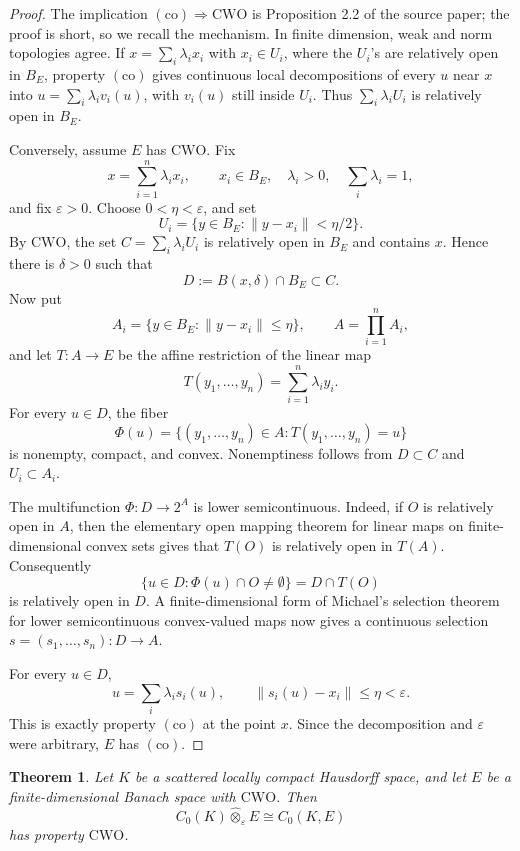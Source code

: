 \documentclass[11pt]{article}
\newtheorem{theorem}{Theorem}
\newcommand{\CWO}{\mathrm{CWO}}
\newcommand{\co}{\mathrm{(co)}}
\newcommand{\eps}{\varepsilon}
\begin{document}
\begin{proof}
The implication \(\co\Rightarrow \CWO\) is Proposition 2.2 of the source
paper; the proof is short, so we recall the mechanism. In finite dimension,
weak and norm topologies agree. If \(x=\sum_i\lambda_i x_i\) with
\(x_i\in U_i\), where the \(U_i\)'s are relatively open in \(B_E\), property
\(\co\) gives continuous local decompositions of every \(u\) near \(x\) into
\(u=\sum_i\lambda_i v_i(u)\), with \(v_i(u)\) still inside \(U_i\). Thus
\(\sum_i\lambda_i U_i\) is relatively open in \(B_E\).

Conversely, assume \(E\) has \(\CWO\). Fix
\[
  x=\sum_{i=1}^n \lambda_i x_i,\qquad
  x_i\in B_E,\quad \lambda_i>0,\quad \sum_i\lambda_i=1,
\]
and fix \(\varepsilon>0\). Choose \(0<\eta<\varepsilon\), and set
\[
  U_i=\{y\in B_E:\|y-x_i\|<\eta/2\}.
\]
By \(\CWO\), the set \(C=\sum_i\lambda_i U_i\) is relatively open in \(B_E\)
and contains \(x\). Hence there is \(\delta>0\) such that
\[
  D:=B(x,\delta)\cap B_E\subset C.
\]
Now put
\[
  A_i=\{y\in B_E:\|y-x_i\|\leq \eta\},\qquad
  A=\prod_{i=1}^n A_i,
\]
and let \(T:A\to E\) be the affine restriction of the linear map
\[
  T(y_1,\ldots,y_n)=\sum_{i=1}^n\lambda_i y_i.
\]
For every \(u\in D\), the fiber
\[
  \Phi(u)=\{(y_1,\ldots,y_n)\in A:T(y_1,\ldots,y_n)=u\}
\]
is nonempty, compact, and convex. Nonemptiness follows from \(D\subset C\)
and \(U_i\subset A_i\).

The multifunction \(\Phi:D\to 2^A\) is lower semicontinuous. Indeed, if
\(O\) is relatively open in \(A\), then the elementary open mapping theorem
for linear maps on finite-dimensional convex sets gives that \(T(O)\) is
relatively open in \(T(A)\). Consequently
\[
  \{u\in D:\Phi(u)\cap O\neq\emptyset\}=D\cap T(O)
\]
is relatively open in \(D\). A finite-dimensional form of Michael's
selection theorem for lower semicontinuous convex-valued maps now gives a
continuous selection \(s=(s_1,\ldots,s_n):D\to A\).

For every \(u\in D\),
\[
  u=\sum_i\lambda_i s_i(u),
  \qquad \|s_i(u)-x_i\|\leq\eta<\varepsilon.
\]
This is exactly property \(\co\) at the point \(x\). Since the decomposition
and \(\varepsilon\) were arbitrary, \(E\) has \(\co\).
\end{proof}

\begin{theorem}
Let \(K\) be a scattered locally compact Hausdorff space, and let \(E\) be a
finite-dimensional Banach space with \(\CWO\). Then
\[
  C_0(K)\widehat{\otimes}_{\eps}E\cong C_0(K,E)
\]
has property \(\CWO\).
\end{theorem}
\end{document}
